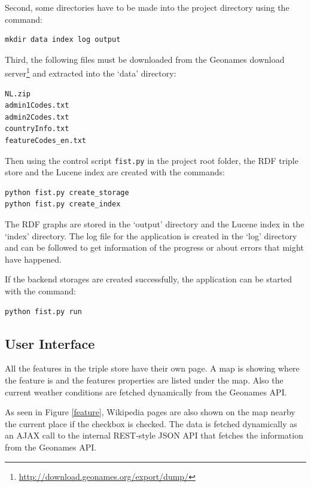 \documentclass[a4paper,12pt]{article}
\begin{document}
Second, some directories have to be made into the project directory
using the command:

\begin{verbatim}
mkdir data index log output
\end{verbatim}

\noindent Third, the following files must be downloaded from the
Geonames download
server\footnote{\url{http://download.geonames.org/export/dump/}} and
extracted into the `data' directory:

\begin{verbatim}
NL.zip
admin1Codes.txt
admin2Codes.txt
countryInfo.txt
featureCodes_en.txt
\end{verbatim}

\noindent Then using the control script \texttt{fist.py} in the
project root folder, the RDF triple store and the Lucene index are
created with the commands:

\begin{verbatim}
python fist.py create_storage
python fist.py create_index
\end{verbatim}

\noindent The RDF graphs are stored in the `output' directory and the
Lucene index in the `index' directory. The log file for the
application is created in the `log' directory and can be followed to
get information of the progress or about errors that might have
happened.

If the backend storages are created successfully, the application can
be started with the command:

\begin{verbatim}
python fist.py run
\end{verbatim}

\subsection{User Interface}

All the features in the triple store have their own page. A map is
showing where the feature is and the features properties are listed
under the map. Also the current weather conditions are fetched
dynamically from the Geonames API.

As seen in Figure \ref{feature}, Wikipedia pages are also shown on the
map nearby the current place if the checkbox is checked. The data is
fetched dynamically as an AJAX call to the internal REST-style JSON
API that fetches the information from the Geonames API.
\end{document}
